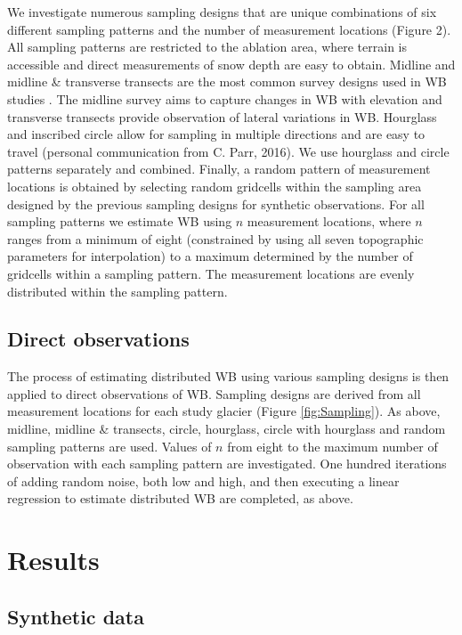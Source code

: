 \documentclass[twocolumn,letterpaper]{igs}
\begin{document}
We investigate numerous sampling designs that are unique combinations of six different sampling patterns and the number of measurement locations (Figure 2). All sampling patterns are restricted to the ablation area, where terrain is accessible and direct measurements of snow depth are easy to obtain. Midline and midline \& transverse transects are the most common survey designs used in WB studies \citep[e.g.][]{Kaser2002,Machguth2006}. The midline survey aims to capture changes in WB with elevation and transverse transects provide observation of lateral variations in WB. Hourglass and inscribed circle allow for sampling in multiple directions and are easy to travel (personal communication from C. Parr, 2016). We use hourglass and circle patterns separately and combined. Finally, a random pattern of measurement locations is obtained by selecting random gridcells within the sampling area designed by the previous sampling designs for synthetic observations. For all sampling patterns we estimate WB using $n$ measurement locations, where $n$ ranges from a minimum of eight (constrained by using all seven topographic parameters for interpolation) to a maximum determined by the number of gridcells within a sampling pattern. The measurement locations are evenly distributed within the sampling pattern. 

\subsection{Direct observations}

The process of estimating distributed WB using various sampling designs is then applied to direct observations of WB. Sampling designs are derived from all measurement locations for each study glacier (Figure \ref{fig:Sampling}). As above, midline, midline \& transects, circle, hourglass, circle with hourglass and random sampling patterns are used. Values of $n$ from eight to the maximum number of observation with each sampling pattern are investigated. One hundred iterations of adding random noise, both low and high, and then executing a linear regression to estimate distributed WB are completed, as above. 

\section{Results }

\subsection{Synthetic data}
\end{document}
